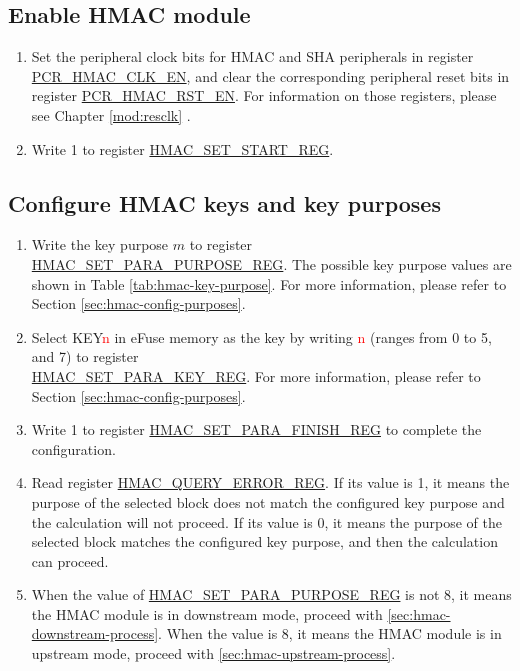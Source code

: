 \documentclass[main\_\_EN.tex]{subfiles}
\begin{document}
\subsection{Enable HMAC module}
\label{sec:hmac-enable-module}

    \begin{enumerate}
        \item Set the peripheral clock bits for HMAC and SHA peripherals in register \hyperref[fielddesc:PCRHMACCLKEN]{PCR\_HMAC\_CLK\_EN}, and clear the corresponding peripheral reset bits in register \hyperref[fielddesc:PCRHMACRSTEN]{PCR\_HMAC\_RST\_EN}. For information on those registers, please see Chapter \ref{mod:resclk} \textit{}.
        \item Write 1 to register \hyperref[regdesc:HMACSETSTARTREG]{HMAC\_SET\_START\_REG}.
    \end{enumerate}

\subsection{Configure HMAC keys and key purposes}

    \begin{enumerate}
        \item Write the key purpose \begin{math}m\end{math} to register \hyperref[regdesc:HMACSETPARAPURPOSEREG]{HMAC\_SET\_PARA\_PURPOSE\_REG}. The possible key purpose values are shown in Table \ref{tab:hmac-key-purpose}. For more information, please refer to Section \ref{sec:hmac-config-purposes}.
        \item Select KEY\textcolor{red}{n} in eFuse memory as the key by writing \textcolor{red}{n} (ranges from 0 to 5, and 7) to register\\ \hyperref[regdesc:HMACSETPARAKEYREG]{HMAC\_SET\_PARA\_KEY\_REG}. For more information, please refer to Section \ref{sec:hmac-config-purposes}.
        \item Write 1 to register \hyperref[regdesc:HMACSETPARAFINISHREG]{HMAC\_SET\_PARA\_FINISH\_REG} to complete the configuration.
        \item Read register \hyperref[regdesc:HMACQUERYERRORREG]{HMAC\_QUERY\_ERROR\_REG}. If its value is 1, it means the purpose of the selected block does not match the configured key purpose and the calculation will not proceed. If its value is 0, it means the purpose of the selected block matches the configured key purpose, and then the calculation can proceed.
        \item When the value of \hyperref[regdesc:HMACSETPARAPURPOSEREG]{HMAC\_SET\_PARA\_PURPOSE\_REG} is not 8, it means the HMAC module is in downstream mode, proceed with \ref{sec:hmac-downstream-process}. When the value is 8, it means the HMAC module is in upstream mode, proceed with \ref{sec:hmac-upstream-process}.
    \end{enumerate}
\end{document}

